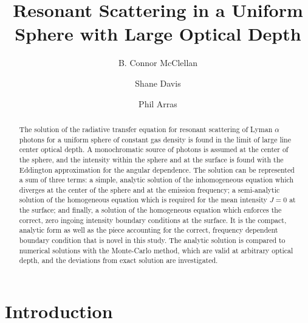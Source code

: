 \documentclass{aastex63}
\begin{document}
\title{Resonant Scattering in a Uniform Sphere with Large Optical Depth}




\author{B. Connor McClellan}
\author{Shane Davis}
\author{Phil Arras}


\begin{abstract}

The solution of the radiative transfer equation for resonant scattering of Lyman $\alpha$ photons for a uniform sphere of constant gas density is found in the limit of large line center optical depth. A monochromatic source of photons is assumed at the center of the sphere, and the intensity within the sphere and at the surface is found with the Eddington approximation for the angular dependence. The solution can be represented a sum of three terms: a simple, analytic solution of the inhomogeneous equation which diverges at the center of the sphere and at the emission frequency; a semi-analytic solution of the homogeneous equation which is required for the mean intensity $J=0$ at the surface; and finally, a solution of the homogeneous equation which enforces the correct, zero ingoing intensity boundary conditions at the surface. It is the compact, analytic form as well as the piece accounting for the correct, frequency dependent boundary condition that is novel in this study. The analytic solution is compared to numerical solutions with the Monte-Carlo method, which are valid at arbitrary optical depth, and the deviations from exact solution are investigated.

\end{abstract}


\keywords{}



\section{Introduction} 
\label{sec:intro}
\end{document}
